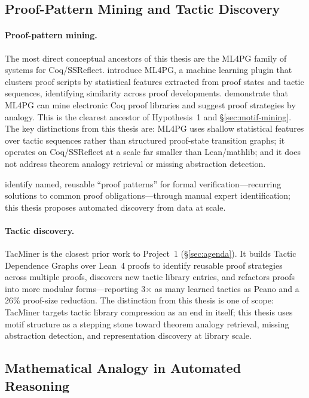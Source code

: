 \documentclass[12pt, a4paper]{article}
\begin{document}
\subsection{Proof-Pattern Mining and Tactic Discovery}

\paragraph{Proof-pattern mining.}
The most direct conceptual ancestors of this thesis are the ML4PG family of
systems for Coq/SSReflect. \citet{komendantskaya2012ml4pg} introduce ML4PG,
a machine learning plugin that clusters proof scripts by statistical features
extracted from proof states and tactic sequences, identifying similarity
across proof developments. \citet{heras2014recycling} demonstrate that ML4PG
can mine electronic Coq proof libraries and suggest proof strategies by
analogy. This is the clearest ancestor of Hypothesis~1 and
\S\ref{sec:motif-mining}. The key distinctions from this thesis are:
ML4PG uses shallow statistical features over tactic sequences rather than
structured proof-state transition graphs; it operates on Coq/SSReflect at a
scale far smaller than Lean/mathlib; and it does not address theorem analogy
retrieval or missing abstraction detection.

\citet{freitas2014} identify named, reusable ``proof patterns'' for formal
verification---recurring solutions to common proof obligations---through
manual expert identification; this thesis proposes automated discovery from
data at scale.

\paragraph{Tactic discovery.}
TacMiner \citep{xin2025tacminer} is the closest prior work to Project~1
(\S\ref{sec:agenda}). It builds Tactic Dependence Graphs over Lean~4 proofs
to identify reusable proof strategies across multiple proofs, discovers new
tactic library entries, and refactors proofs into more modular forms---reporting
3$\times$ as many learned tactics as Peano and a 26\% proof-size reduction.
The distinction from this thesis is one of scope: TacMiner targets tactic
library compression as an end in itself; this thesis uses motif structure as a
stepping stone toward theorem analogy retrieval, missing abstraction detection,
and representation discovery at library scale.

\subsection{Mathematical Analogy in Automated Reasoning}
\end{document}
